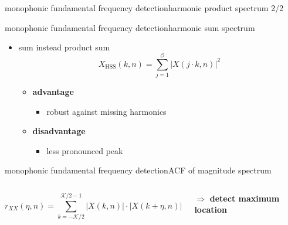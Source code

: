 	\begin{frame}{monophonic fundamental frequency detection}{harmonic product spectrum 2/2}
	\end{frame}
	
	\begin{frame}{monophonic fundamental frequency detection}{harmonic sum spectrum}
        \begin{itemize}
            \item   sum instead product sum
        \begin{equation*}\label{eq:hss}
            X_{\mathrm{HSS}}(k,n) = \sum\limits_{j=1}^{\mathcal{O}}{|X(j\cdot k,n)|^2} 
        \end{equation*}
        \bigskip

                \begin{itemize}
                    \item<1->   \textbf{advantage}
                        \begin{itemize}
                            \item   robust against missing harmonics
                        \end{itemize}
                    \item<1->   \textbf{disadvantage}
                        \begin{itemize}
                            \item   less pronounced peak
                        \end{itemize}
                \end{itemize}
        \end{itemize}
	\end{frame}
	
	\begin{frame}{monophonic fundamental frequency detection}{ACF of magnitude spectrum}
        \vspace{-3mm}
        \begin{columns}
        \begin{footnotesize}
		\begin{equation*}
			r_{XX}(\eta,n) = \sum\limits_{k=-\mathcal{K}/2}^{\mathcal{K}/2-1}{|X(k,n)|\cdot |X(k+\eta,n)|}
		\end{equation*}
        \end{footnotesize}
		$\Rightarrow$ \textbf{detect maximum location}
        
        \end{columns}
	\end{frame}
	
